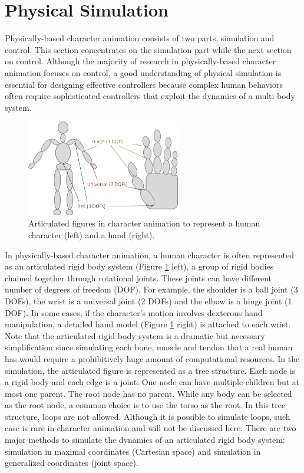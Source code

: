 \section{Physical Simulation}

Physically-based character animation consists of two parts, simulation and control. This section concentrates on the simulation part while the next section on control. Although the majority of research in physically-based character animation focuses on control, a good understanding of physical simulation is essential for designing effective controllers because complex human behaviors often require sophisticated controllers that exploit the dynamics of a multi-body system.

\begin{figure}[h]
  \centering
  \includegraphics[width=0.6\textwidth]{figures/character.jpg}
  \caption{Articulated figures in character animation to represent a human character (left) and a hand (right).}
  \label{fig:character}
\end{figure}

In physically-based character animation, a human character is often represented as an articulated rigid body system (Figure \ref{fig:character} left), a group of rigid bodies chained together through rotational joints. These joints can have different number of degrees of freedom (DOF). For example, the shoulder is a ball joint (3 DOFs), the wrist is a universal joint (2 DOFs) and the elbow is a hinge joint (1 DOF). In some cases, if the character's motion involves dexterous hand manipulation, a detailed hand model (Figure \ref{fig:character} right) is attached to each wrist. Note that the articulated rigid body system is a dramatic but necessary simplification since simulating each bone, muscle and tendon that a real human has would require a prohibitively huge amount of computational resources. In the simulation, the articulated figure is represented as a tree structure. Each node is a rigid body and each edge is a joint. One node can have multiple children but at most one parent. The root node has no parent. While any body can be selected as the root node, a common choice is to use the torso as the root. In this tree structure, loops are not allowed. Although it is possible to simulate loops, such case is rare in character animation and will not be discussed here. There are two major methods to simulate the dynamics of an articulated rigid body system: simulation in maximal coordinates (Cartesian space) and simulation in generalized coordinates (joint space).



